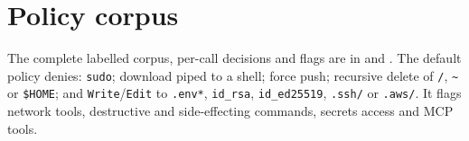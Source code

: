 \documentclass[11pt]{article}
\begin{document}
\section{Policy corpus}\label{app:corpus}
The complete labelled corpus, per-call decisions and flags are in  and . The default policy denies: \texttt{sudo}; download piped to a shell; force push; recursive delete of \texttt{/}, \texttt{\textasciitilde} or \texttt{\$HOME}; and \texttt{Write}/\texttt{Edit} to \texttt{.env*}, \texttt{id\_rsa}, \texttt{id\_ed25519}, \texttt{.ssh/} or \texttt{.aws/}. It flags network tools, destructive and side-effecting commands, secrets access and MCP tools.
\end{document}
